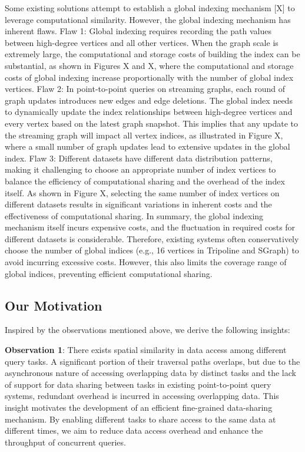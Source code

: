\documentclass[lettersize,journal]{IEEEtran} %
\begin{document}
Some existing solutions attempt to establish a global indexing mechanism [X] to leverage computational similarity. However, the global indexing mechanism has inherent flaws. Flaw 1: Global indexing requires recording the path values between high-degree vertices and all other vertices. When the graph scale is extremely large, the computational and storage costs of building the index can be substantial, as shown in Figures X and X, where the computational and storage costs of global indexing increase proportionally with the number of global index vertices. Flaw 2: In point-to-point queries on streaming graphs, each round of graph updates introduces new edges and edge deletions. The global index needs to dynamically update the index relationships between high-degree vertices and every vertex based on the latest graph snapshot. This implies that any update to the streaming graph will impact all vertex indices, as illustrated in Figure X, where a small number of graph updates lead to extensive updates in the global index. Flaw 3: Different datasets have different data distribution patterns, making it challenging to choose an appropriate number of index vertices to balance the efficiency of computational sharing and the overhead of the index itself. As shown in Figure X, selecting the same number of index vertices on different datasets results in significant variations in inherent costs and the effectiveness of computational sharing. In summary, the global indexing mechanism itself incurs expensive costs, and the fluctuation in required costs for different datasets is considerable. Therefore, existing systems often conservatively choose the number of global indices (e.g., 16 vertices in Tripoline and SGraph) to avoid incurring excessive costs. However, this also limits the coverage range of global indices, preventing efficient computational sharing.


\subsection{Our Motivation}
Inspired by the observations mentioned above, we derive the following insights:

{\bf{Observation 1}}: There exists spatial similarity in data access among different query tasks. A significant portion of their traversal paths overlaps, but due to the asynchronous nature of accessing overlapping data by distinct tasks and the lack of support for data sharing between tasks in existing point-to-point query systems, redundant overhead is incurred in accessing overlapping data. This insight motivates the development of an efficient fine-grained data-sharing mechanism. By enabling different tasks to share access to the same data at different times, we aim to reduce data access overhead and enhance the throughput of concurrent queries.
\end{document}
